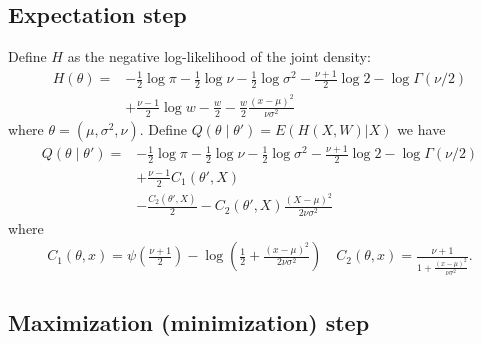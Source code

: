 \documentclass[a4paper,12pt]{article}
\begin{document}
\subsection{Expectation step}
Define $H$ as the negative log-likelihood of the joint density:
\begin{align*}
    H(\theta)=&-\frac{1}{2}\log \pi
        -\frac{1}{2}\log\nu
        -\frac{1}{2}\log\sigma^2
        -\frac{\nu + 1}{2}\log 2
        -\log\Gamma(\nu / 2)\\
        &+\frac{\nu - 1}{2}\log w 
        -\frac{w}{2}- \frac{w}{2}\frac{(x - \mu)^2}{\nu\sigma^2}
\end{align*}
where $\theta = (\mu, \sigma^2, \nu)$. Define $Q(\theta \mid \theta')=E(H(X, W) | X)$ we have
\begin{align*}
    Q(\theta \mid \theta')=&-\frac{1}{2}\log \pi
    -\frac{1}{2}\log\nu
    -\frac{1}{2}\log\sigma^2
    -\frac{\nu + 1}{2}\log 2
    -\log\Gamma(\nu / 2)\\
    &+\frac{\nu - 1}{2}C_{1}(\theta', X)\\
    &-\frac{C_{2}(\theta', X)}{2}
    -C_{2}(\theta', X)\frac{(X - \mu)^2}{2\nu\sigma^2}
\end{align*}
where
\begin{align*}
    C_{1}(\theta, x) = \psi\left(\frac{\nu + 1}{2}\right)-\log\left(\frac{1}{2}+\frac{(x - \mu)^2}{2\nu\sigma^2}\right) \quad 
    C_{2}(\theta, x) = \frac{\nu + 1}{1+\frac{(x -\mu)^2}{\nu\sigma^2}}.
\end{align*}
\subsection{Maximization (minimization) step}
\end{document}
